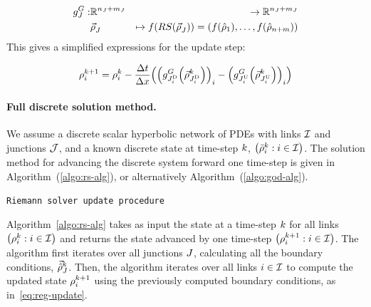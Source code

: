\begin{eqnarray}
\god_{\jn}: & \mathbb{R}^{\ninc_{\jn}+\nout_{\jn}} & \rightarrow\mathbb{R}^{\ninc_{\jn}+\nout_{\jn}}\nonumber \\
 & \juncstate{\jn}{} & \mapsto f\left(RS\left(\juncstate{\jn}{}\right)\right)=\left(f\left(\trace{\dvar}_{1}\right),\ldots,f\left(\trace{\dvar}_{\ninc+\nout}\right)\right)\label{eq:god-jn}
\end{eqnarray}
This gives a simplified expressions for the update step:

\begin{equation}
\discrete{\link}{\tind+1}=\discrete{\link}{\tind}-\dfrac{\Delta t}{\Delta x}\left(\left(\god_{\jdown{\link}}\left(\juncstate{\jdown{\link}}{\tind}\right)\right)_{\link}-\left(\god_{\jup{\link}}\left(\juncstate{\jup{\link}}{\tind}\right)\right)_{\link}\right)\label{eq:composed-flux}
\end{equation}



\paragraph{Full discrete solution method.\label{par:Full-solution-method}}

We assume a discrete scalar hyperbolic network of PDEs with links
$\mathcal{I}$ and junctions $\mathcal{J}$, and a known discrete state at time-step
$k$, $\left(\initdiscrete_{\link}^{\tind}:\link\in\links\right)$.
The solution method for advancing the discrete system forward one
time-step is given in Algorithm~(\ref{algo:rs-alg}), or alternatively
Algorithm~(\ref{algo:god-alg}).

\begin{algorithm}[H]
\caption{\texttt{Riemann solver update procedure}}



\end{algorithm}


Algorithm~\ref{algo:rs-alg} takes as input the state at a time-step
$k$ for all links $\left(\discrete{\link}{\tind}:\link\in\links\right)$
and returns the state advanced by one time-step $\left(\discrete{\link}{\tind+1}:\link\in\links\right)$.
The algorithm first iterates over all junctions $J$, calculating
all the boundary conditions, $\vec{\hat{\rho}}_{J}^{k}$. Then, the
algorithm iterates over all links $i\in\mathcal{I}$ to compute the
updated state $\rho_{i}^{k+1}$ using the previously computed
boundary conditions, as in~\ref{eq:reg-update}.

